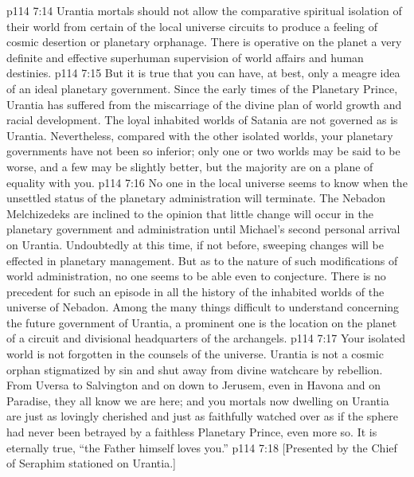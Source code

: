 \vs p114 7:14 \pc Urantia mortals should not allow the comparative spiritual isolation of their world from certain of the local universe circuits to produce a feeling of cosmic desertion or planetary orphanage. There is operative on the planet a very definite and effective superhuman supervision of world affairs and human destinies.
\vs p114 7:15 But it is true that you can have, at best, only a meagre idea of an ideal planetary government. Since the early times of the Planetary Prince, Urantia has suffered from the miscarriage of the divine plan of world growth and racial development. The loyal inhabited worlds of Satania are not governed as is Urantia. Nevertheless, compared with the other isolated worlds, your planetary governments have not been so inferior; only one or two worlds may be said to be worse, and a few may be slightly better, but the majority are on a plane of equality with you.
\vs p114 7:16 No one in the local universe seems to know when the unsettled status of the planetary administration will terminate. The Nebadon Melchizedeks are inclined to the opinion that little change will occur in the planetary government and administration until Michael’s second personal arrival on Urantia. Undoubtedly at this time, if not before, sweeping changes will be effected in planetary management. But as to the nature of such modifications of world administration, no one seems to be able even to conjecture. There is no precedent for such an episode in all the history of the inhabited worlds of the universe of Nebadon. Among the many things difficult to understand concerning the future government of Urantia, a prominent one is the location on the planet of a circuit and divisional headquarters of the archangels.
\vs p114 7:17 Your isolated world is not forgotten in the counsels of the universe. Urantia is not a cosmic orphan stigmatized by sin and shut away from divine watchcare by rebellion. From Uversa to Salvington and on down to Jerusem, even in Havona and on Paradise, they all know we are here; and you mortals now dwelling on Urantia are just as lovingly cherished and just as faithfully watched over as if the sphere had never been betrayed by a faithless Planetary Prince, even more so. It is eternally true, “the Father himself loves you.”
\vsetoff
\vs p114 7:18 [Presented by the Chief of Seraphim stationed on Urantia.]
\quizlink
